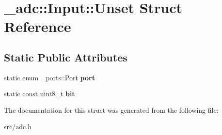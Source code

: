 \hypertarget{struct__adc_1_1Input_1_1Unset}{}\section{\+\_\+adc\+:\+:Input\+:\+:Unset Struct Reference}
\label{struct__adc_1_1Input_1_1Unset}
\subsection*{Static Public Attributes}
\begin{DoxyCompactItemize}
\item 
static enum \+\_\+ports\+::\+Port {\bfseries port}\hypertarget{struct__adc_1_1Input_1_1Unset_a36ae94360b25ac73ed0647d674bd6286}{}\label{struct__adc_1_1Input_1_1Unset_a36ae94360b25ac73ed0647d674bd6286}

\item 
static const uint8\+\_\+t {\bfseries bit}\hypertarget{struct__adc_1_1Input_1_1Unset_a15639c7f4bb10d8e49cbcce2231230cb}{}\label{struct__adc_1_1Input_1_1Unset_a15639c7f4bb10d8e49cbcce2231230cb}

\end{DoxyCompactItemize}


The documentation for this struct was generated from the following file\+:\begin{DoxyCompactItemize}
\item 
src/adc.\+h\end{DoxyCompactItemize}
